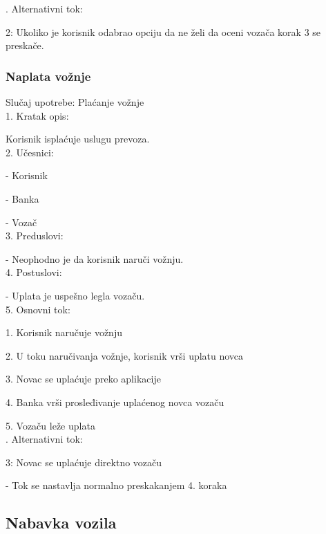 . Alternativni tok:
\par 2: Ukoliko je korisnik odabrao opciju da ne želi da oceni vozača korak 3 se preskače.

\subsubsection{\bfseries Naplata vo\v znje}
\noindent Slučaj upotrebe: Plaćanje vožnje \\
1. Kratak opis:
\par Korisnik isplaćuje uslugu prevoza. \\
2.  Učesnici:  
\par - Korisnik
\par - Banka
\par - Vozač \\
3. Preduslovi: 
\par - Neophodno je da korisnik naruči vožnju. \\
4. Postuslovi:
\par - Uplata je uspešno legla vozaču. \\
5. Osnovni tok:
\par 1. Korisnik naručuje vožnju
\par 2.  U toku naručivanja vožnje, korisnik vrši uplatu novca
\par 3.  Novac se uplaćuje preko aplikacije
\par 4. Banka vrši prosleđivanje uplaćenog novca  vozaču
\par 5. Vozaču leže uplata \\

. Alternativni tok:
\par 3: Novac se uplaćuje direktno vozaču
\par - Tok se nastavlja normalno preskakanjem 4. koraka

\newpage

\subsection{\bfseries Nabavka vozila}

